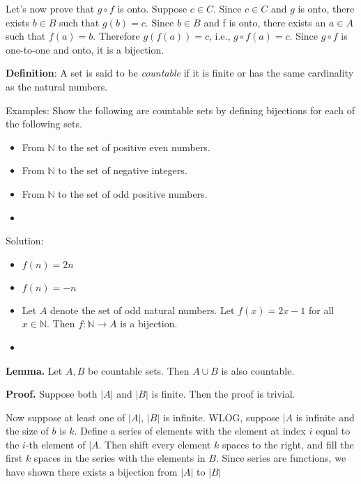 \documentclass{article}
\begin{document}
    \qquad Let’s now prove that $g \circ f$ is onto. Suppose $c \in C$. Since $c \in C$ and $g$ is onto, there exists $b \in B$ such that $g(b) = c$. Since $b \in B$ and f is onto, there exists an $a \in A$ such that $f(a) = b$. Therefore $g(f(a)) = c$, i.e., $g \circ f(a) = c$. Since $g \circ f$ is one-to-one and onto, it is a bijection.
    
    \vspace{1.5mm}
    \textbf{Definition}: A set is said to be \textit{countable} if it is finite or has the same cardinality as the natural numbers.

    Examples: 
    Show the following are countable sets by defining bijections for each of the following sets.
    
    \begin{itemize}
        \item From $\mathbb{N}$ to the set of positive even numbers.
        \item From $\mathbb{N}$ to the set of negative integers.
        \item From $\mathbb{N}$ to the set of odd positive numbers.
        \item 
    \end{itemize}
    
    Solution:
    \begin{itemize}
        \item $f(n) = 2n$
        \item $f(n) = -n$
        \item  Let $A$ denote the set of odd natural numbers. Let $f(x) = 2x - 1$ for all $x \in \mathbb{N}$. Then $f: \mathbb{N} \rightarrow A$ is a bijection.
        \item 
    \end{itemize}
    
    
    \vspace{1.5mm}
    \textbf{Lemma.} Let $A, B$ be countable sets. Then $A \cup B$ is also countable.
    
    \vspace{1.5mm}
    \textbf{Proof.}
    Suppose both $|A|$ and $|B|$ is finite. Then the proof is trivial.
    
    Now suppose at least one of $|A|$, $|B|$ is infinite. WLOG, suppose $|A$ is infinite and the size of $b$ is $k$. Define a series of elements with the element at index $i$ equal to the $i$-th element of $|A$. Then shift every element $k$ spaces to the right, and fill the first $k$ spaces in the series with the elements in $B$. Since series are functions, we have shown there exists a bijection from $|A|$ to $|B|$
    
\end{document}
